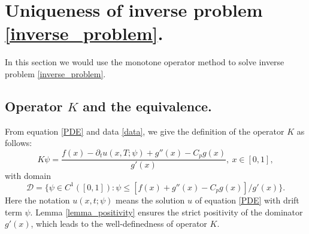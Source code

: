 \documentclass[11pt]{article}
\numberwithin{equation}{section}
\begin{document}
\section{Uniqueness of inverse problem \eqref{inverse_problem}.}\label{section_unique}
In this section we would use the monotone operator method to solve inverse problem \eqref{inverse_problem}.

\subsection{Operator $K$ and the equivalence.}
From equation \eqref{PDE} and data \eqref{data}, we give the definition of the operator $K$ as follows:  
\begin{equation}\label{operator}
 K\psi=\frac{f(x)-\partial_tu(x,T;\psi)+g''(x)-C_pg(x)}{g'(x)},\ x\in[0,1],
\end{equation}
with domain 
\begin{equation}\label{domain}
 \mathcal D=\{\psi\in C^1([0,1]):\psi\le [f(x)+g''(x)-C_pg(x)]/g'(x)\}.
\end{equation}
Here the notation $u(x,t;\psi)$ means the solution $u$ of equation \eqref{PDE} with drift term $\psi$. Lemma \ref{lemma_positivity} ensures the strict positivity of the dominator $g'(x)$, which leads to the well-definedness of operator $K$. 
\end{document}
